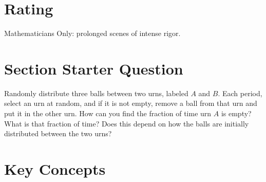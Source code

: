 \documentclass[12pt]{article}
\begin{document}
\myheader \mytitle

\hr


\hr

\usefirefox



\hr

\section*{Rating} %
Mathematicians Only:  prolonged scenes of intense rigor.

\hr

\section*{Section Starter Question}

Randomly distribute three balls between two urns, labeled \( A \) and \(
B \).  Each period, select an urn at random, and if it is not empty,
remove a ball from that urn and put it in the other urn.  How can you
find the fraction of time urn \( A \) is empty?  What is that fraction
of time?  Does this depend on how the balls are initially distributed
between the two urns?

\hr

\section*{Key Concepts}
\end{document}
